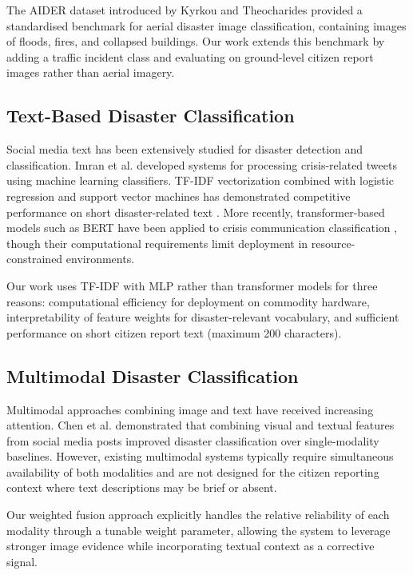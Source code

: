 \documentclass[conference]{IEEEtran}
\begin{document}
The AIDER dataset introduced by Kyrkou and Theocharides \cite{kyrkou2019aider} provided a standardised benchmark for aerial disaster image classification, containing images of floods, fires, and collapsed buildings. Our work extends this benchmark by adding a traffic incident class and evaluating on ground-level citizen report images rather than aerial imagery.

\subsection{Text-Based Disaster Classification}

Social media text has been extensively studied for disaster detection and classification. Imran et al. \cite{imran2015processing} developed systems for processing crisis-related tweets using machine learning classifiers. TF-IDF vectorization combined with logistic regression and support vector machines has demonstrated competitive performance on short disaster-related text \cite{caragea2016identifying}. More recently, transformer-based models such as BERT have been applied to crisis communication classification \cite{li2019deep}, though their computational requirements limit deployment in resource-constrained environments.

Our work uses TF-IDF with MLP rather than transformer models for three reasons: computational efficiency for deployment on commodity hardware, interpretability of feature weights for disaster-relevant vocabulary, and sufficient performance on short citizen report text (maximum 200 characters).

\subsection{Multimodal Disaster Classification}

Multimodal approaches combining image and text have received increasing attention. Chen et al. \cite{chen2018disaster} demonstrated that combining visual and textual features from social media posts improved disaster classification over single-modality baselines. However, existing multimodal systems typically require simultaneous availability of both modalities and are not designed for the citizen reporting context where text descriptions may be brief or absent.

Our weighted fusion approach explicitly handles the relative reliability of each modality through a tunable weight parameter, allowing the system to leverage stronger image evidence while incorporating textual context as a corrective signal.
\end{document}
